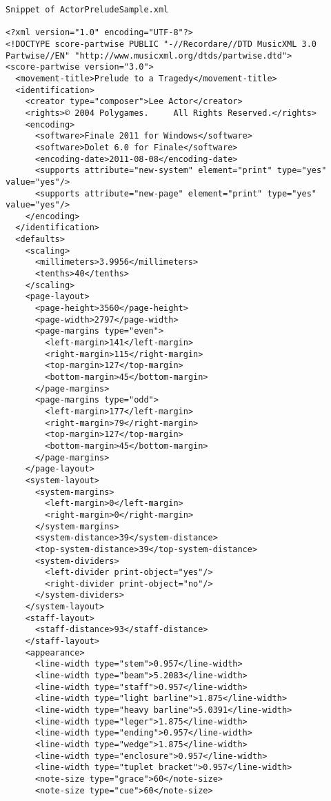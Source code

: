 \documentclass[11pt,english]{article}
\begin{document}
\begin{lstlisting}
Snippet of ActorPreludeSample.xml

<?xml version="1.0" encoding="UTF-8"?>
<!DOCTYPE score-partwise PUBLIC "-//Recordare//DTD MusicXML 3.0 Partwise//EN" "http://www.musicxml.org/dtds/partwise.dtd">
<score-partwise version="3.0">
  <movement-title>Prelude to a Tragedy</movement-title>
  <identification>
    <creator type="composer">Lee Actor</creator>
    <rights>© 2004 Polygames.     All Rights Reserved.</rights>
    <encoding>
      <software>Finale 2011 for Windows</software>
      <software>Dolet 6.0 for Finale</software>
      <encoding-date>2011-08-08</encoding-date>
      <supports attribute="new-system" element="print" type="yes" value="yes"/>
      <supports attribute="new-page" element="print" type="yes" value="yes"/>
    </encoding>
  </identification>
  <defaults>
    <scaling>
      <millimeters>3.9956</millimeters>
      <tenths>40</tenths>
    </scaling>
    <page-layout>
      <page-height>3560</page-height>
      <page-width>2797</page-width>
      <page-margins type="even">
        <left-margin>141</left-margin>
        <right-margin>115</right-margin>
        <top-margin>127</top-margin>
        <bottom-margin>45</bottom-margin>
      </page-margins>
      <page-margins type="odd">
        <left-margin>177</left-margin>
        <right-margin>79</right-margin>
        <top-margin>127</top-margin>
        <bottom-margin>45</bottom-margin>
      </page-margins>
    </page-layout>
    <system-layout>
      <system-margins>
        <left-margin>0</left-margin>
        <right-margin>0</right-margin>
      </system-margins>
      <system-distance>39</system-distance>
      <top-system-distance>39</top-system-distance>
      <system-dividers>
        <left-divider print-object="yes"/>
        <right-divider print-object="no"/>
      </system-dividers>
    </system-layout>
    <staff-layout>
      <staff-distance>93</staff-distance>
    </staff-layout>
    <appearance>
      <line-width type="stem">0.957</line-width>
      <line-width type="beam">5.2083</line-width>
      <line-width type="staff">0.957</line-width>
      <line-width type="light barline">1.875</line-width>
      <line-width type="heavy barline">5.0391</line-width>
      <line-width type="leger">1.875</line-width>
      <line-width type="ending">0.957</line-width>
      <line-width type="wedge">1.875</line-width>
      <line-width type="enclosure">0.957</line-width>
      <line-width type="tuplet bracket">0.957</line-width>
      <note-size type="grace">60</note-size>
      <note-size type="cue">60</note-size>

\end{lstlisting}
\end{document}

